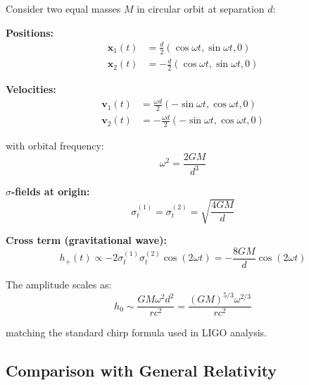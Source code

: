 \documentclass[11pt,a4paper]{article}
\theoremstyle{definition}
\theoremstyle{remark}
\begin{document}
	Consider two equal masses $M$ in circular orbit at separation $d$:
	
	\textbf{Positions:}
	\begin{align}
		\mathbf{x}_1(t) &= \frac{d}{2}(\cos\omega t, \sin\omega t, 0) \\
		\mathbf{x}_2(t) &= -\frac{d}{2}(\cos\omega t, \sin\omega t, 0)
	\end{align}
	
	\textbf{Velocities:}
	\begin{align}
		\mathbf{v}_1(t) &= \frac{\omega d}{2}(-\sin\omega t, \cos\omega t, 0) \\
		\mathbf{v}_2(t) &= -\frac{\omega d}{2}(-\sin\omega t, \cos\omega t, 0)
	\end{align}
	
	with orbital frequency:
	\begin{equation}
		\omega^2 = \frac{2GM}{d^3}
	\end{equation}
	
	\textbf{$\sigma$-fields at origin:}
	\begin{equation}
		\sigma_t^{(1)} = \sigma_t^{(2)} = \sqrt{\frac{4GM}{d}}
	\end{equation}
	
	\textbf{Cross term (gravitational wave):}
	\begin{equation}
		h_{+}(t) \propto -2\sigma_t^{(1)}\sigma_t^{(2)}\cos(2\omega t) = -\frac{8GM}{d}\cos(2\omega t)
	\end{equation}
	
	The amplitude scales as:
	\begin{equation}
		h_0 \sim \frac{GM\omega^2d^2}{rc^2} = \frac{(GM)^{5/3}\omega^{2/3}}{rc^2}
	\end{equation}
	
	matching the standard chirp formula used in LIGO analysis.
	
	\subsection{Comparison with General Relativity}
	
\end{document}

